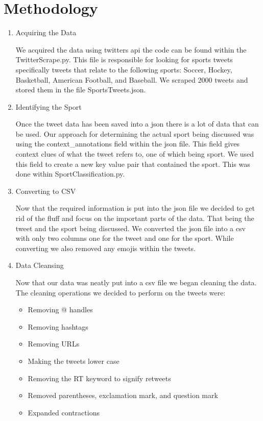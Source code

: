 \documentclass{article}
\begin{document}
\section{Methodology}
\begin{enumerate}
    \item Acquiring the Data
    
    We acquired the data using twitters api the code can be found within the TwitterScrape.py. This file is responsible for looking for sports tweets specifically tweets that relate to the following sports: Soccer, Hockey, Basketball, American Football, and Baseball. We scraped 2000 tweets and stored them in the file SportsTweets.json.
    \item Identifying the Sport
    
    Once the tweet data has been saved into a json there is a lot of data that can be used. Our approach for determining the actual sport being discussed was using the context\_annotations field within the json file. This field gives context clues of what the tweet refers to, one of which being sport. We used this field to create a new key value pair that contained the sport. This was done within SportClassification.py.
    \item Converting to CSV
    
    Now that the required information is put into the json file we decided to get rid of the fluff and focus on the important parts of the data. That being the tweet and the sport being discussed. We converted the json file into a csv with only two columns one for the tweet and one for the sport. While converting we also removed any emojis within the tweets.
    \item Data Cleansing
    
    Now that our data was neatly put into a csv file we began cleaning the data. The cleaning operations we decided to perform on the tweets were:
    
    \begin{itemize}
    \item Removing @ handles
    \item Removing hashtags
    \item Removing URLs
    \item Making the tweets lower case
    \item Removing the RT keyword to signify retweets
    \item Removed parentheses, exclamation mark, and question mark
    \item Expanded contractions
    

\end{itemize}
\end{enumerate}
\end{document}
